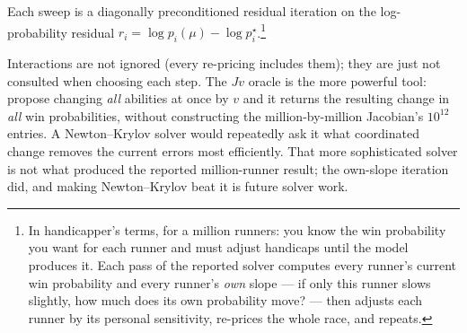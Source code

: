 \documentclass[11pt]{article}
\begin{document}
\begin{center}
\end{center}

Each sweep is a diagonally preconditioned residual iteration on the
log-probability residual
$r_i=\log p_i(\mu)-\log p^{\star}_i$.\footnote{In handicapper's terms,
for a million runners: you know the win probability you want for each
runner and must adjust handicaps until the model produces it. Each pass
of the reported solver computes every runner's current win probability
and every runner's \emph{own} slope --- if only this runner slows
slightly, how much does its own probability move? --- then adjusts each
runner by its personal sensitivity, re-prices the whole race, and
repeats.}

Interactions are not ignored (every re-pricing includes them);
they are just not consulted when choosing each step. The $Jv$ oracle is
the more powerful tool: propose changing \emph{all} abilities at once by
$v$ and it returns the resulting change in \emph{all} win probabilities,
without constructing the million-by-million Jacobian's $10^{12}$
entries. A Newton--Krylov solver would repeatedly ask it what
coordinated change removes the current errors most efficiently. That
more sophisticated solver is not what produced the reported
million-runner result; the own-slope iteration did, and making
Newton--Krylov beat it is future solver work.
\end{document}
